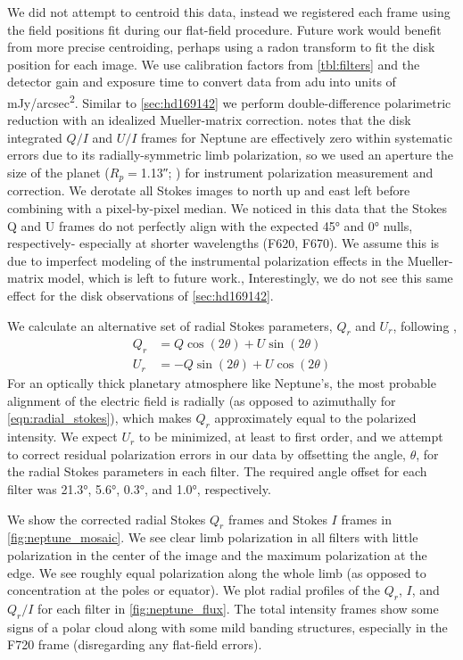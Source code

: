 We did not attempt to centroid this data, instead we registered each frame using the field positions fit during our flat-field procedure. Future work would benefit from more precise centroiding, perhaps using a radon transform to fit the disk position for each image. We use calibration factors from \autoref{tbl:filters} and the detector gain and exposure time to convert data from \si{adu} into units of \si{mJy/arcsec^2}. Similar to \autoref{sec:hd169142} we perform double-difference polarimetric reduction with an idealized Mueller-matrix correction. \citet{schmid_limb_2006} notes that the disk integrated $Q/I$ and $U/I$ frames for Neptune are effectively zero within systematic errors due to its radially-symmetric limb polarization, so we used an aperture the size of the planet ($R_p=$\ang{;;1.13}; \citet{schmid_limb_2006}) for instrument polarization measurement and correction. We derotate all Stokes images to north up and east left before combining with a pixel-by-pixel median. We noticed in this data that the Stokes Q and U frames do not perfectly align with the expected \ang{45} and \ang{0} nulls, respectively- especially at shorter wavelengths (F620, F670). We assume this is due to imperfect modeling of the instrumental polarization effects in the Mueller-matrix model, which is left to future work., Interestingly, we do not see this same effect for the disk observations of \autoref{sec:hd169142}.

We calculate an alternative set of radial Stokes parameters, $Q_r$ and $U_r$, following \citet{schmid_limb_2006},
\begin{align}
    Q_r &= Q\cos{\left(2\theta\right)} + U\sin{\left(2\theta\right)} \\
    U_r &= -Q\sin{\left(2\theta\right)} + U\cos{\left(2\theta\right)}
\end{align}
For an optically thick planetary atmosphere like Neptune's, the most probable alignment of the electric field is radially (as opposed to azimuthally for \autoref{eqn:radial_stokes}), which makes $Q_r$ approximately equal to the polarized intensity. We expect $U_r$ to be minimized, at least to first order, and we attempt to correct residual polarization errors in our data by offsetting the angle, $\theta$, for the radial Stokes parameters in each filter. The required angle offset for each filter was \ang{21.3}, \ang{5.6}, \ang{0.3}, and \ang{1.0}, respectively.

We show the corrected radial Stokes $Q_r$ frames and Stokes $I$ frames in \autoref{fig:neptune_mosaic}. We see clear limb polarization in all filters with little polarization in the center of the image and the maximum polarization at the edge. We see roughly equal polarization along the whole limb (as opposed to concentration at the poles or equator). We plot radial profiles of the $Q_r$, $I$, and $Q_r/I$ for each filter in \autoref{fig:neptune_flux}. The total intensity frames show some signs of a polar cloud along with some mild banding structures, especially in the F720 frame (disregarding any flat-field errors).

